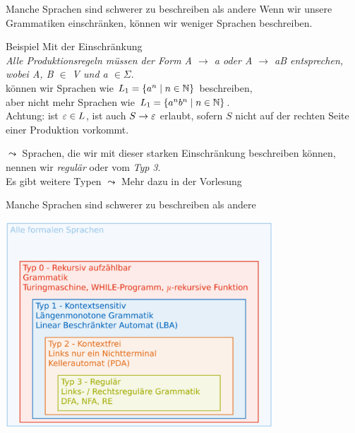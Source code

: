 \begin{frame}[fragile]{Manche Sprachen sind schwerer zu beschreiben als andere}
    Wenn wir unsere Grammatiken einschränken, können wir weniger Sprachen beschreiben.
    \begin{exampleblock}{Beispiel}
        Mit der Einschränkung\\
        \emph{Alle Produktionsregeln müssen der Form \alert{A $\to$ a oder A $\to$ aB} entsprechen, wobei A, B $\in$ V und a $\in \Sigma$}.\\
        können wir Sprachen wie $L_1 = \{a^n \mid n \in \mathbb{N}\}$ beschreiben,\\ aber nicht mehr Sprachen wie $L_1 = \{a^nb^n \mid n \in \mathbb{N}\}$.\\
        \alert{Achtung:} ist $\varepsilon \in L$, ist auch $S\to\varepsilon$ erlaubt, sofern $S$ nicht auf der rechten Seite einer Produktion vorkommt.
    \end{exampleblock}
    $\leadsto$ Sprachen, die wir mit dieser starken Einschränkung beschreiben können, nennen wir \alert{\emph{regulär}} oder vom \alert{\emph{Typ 3}}.\\
    Es gibt weitere Typen $\leadsto$ Mehr dazu in der Vorlesung
\end{frame}

\begin{frame}[fragile]{Manche Sprachen sind schwerer zu beschreiben als andere}
    \begin{center}
        \includegraphics[width=0.75\textwidth]{../figures/Chomsky.png}
    \end{center}
\end{frame}


